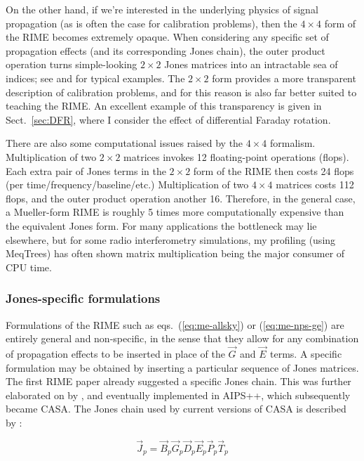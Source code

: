 \documentclass[]{aa}
\newcommand{\jones}[2]{\vec {#1}_{#2}}
\begin{document}
On the other hand, if we're interested in the underlying physics of signal propagation (as is often the case for calibration problems), then the $4\times4$ form of the RIME becomes extremely opaque. When considering any specific set of propagation effects (and its corresponding Jones chain), the outer product operation turns simple-looking $2\times2$ Jones matrices into an intractable sea of indices; see \citet[eq. 4]{SB:imageplane} and \citet[Appendix A]{ME1} for typical examples. The $2\times2$ form provides a more transparent description of calibration problems, and for this reason is also far better suited to teaching the RIME. An excellent example of this transparency is given in Sect.~\ref{sec:DFR}, where I consider the effect of differential Faraday rotation.

There are also some computational issues raised by the $4\times4$ formalism. Multiplication of two $2\times2$ matrices invokes 12 floating-point operations (flops). Each extra pair of Jones terms in the $2\times2$ form of the RIME then costs 24 flops (per time/frequency/baseline/etc.) Multiplication of two $4\times4$ matrices costs 112 flops, and the outer product operation another 16. Therefore, in the general case, a Mueller-form RIME is roughly 5 times more computationally expensive than the equivalent Jones form. For many applications the bottleneck may lie elsewhere, but for some radio interferometry simulations, my profiling (using MeqTrees) has often shown matrix multiplication being the major consumer of CPU time.

\subsubsection{Jones-specific formulations\label{sec:jones-specific}} 

Formulations of the RIME such as eqs.~(\ref{eq:me-allsky}) or (\ref{eq:me-nps-ge}) are entirely general and non-specific, in the sense that they allow for any combination of propagation effects to be inserted in place of the $\jones{G}{}$ and $\jones{E}{}$ terms. A specific formulation may be obtained by inserting a particular sequence of Jones matrices. The first RIME paper \citep{ME1} already suggested a specific Jones chain. This was further elaborated on by \citet{JEN:note185}, and eventually implemented in AIPS++, which subsequently became CASA. The Jones chain used by current versions of CASA is described by \citet[Appendix E.1]{CASA:UserRef}:

\begin{equation}\label{eq:casa}
\jones{J}{p} = \jones{B}{p} \jones{G}{p} \jones{D}{p} \jones{E}{p} \jones{P}{p} \vec  T_p
\end{equation}
\end{document}
